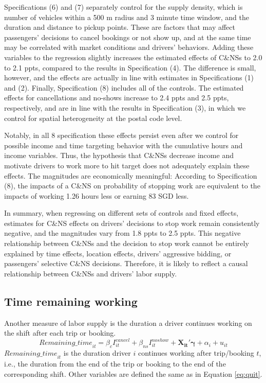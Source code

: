 \documentclass[reviewmode]{AEA}
\begin{document}
Specifications (6) and (7) separately control for the supply density, which is number of vehicles within a 500 m radius and 3 minute time window, and the duration and distance to pickup points. These are factors that may affect passengers' decisions to cancel bookings or not show up, and at the same time may be correlated with market conditions and drivers' behaviors.  Adding these variables to the regression slightly increases the estimated effects of C\&NSs to 2.0 to 2.1 ppts, compared to the results in Specification (4). The difference is small, however, and the effects are actually in line with estimates in Specifications (1) and (2).  Finally, Specification (8) includes all of the controls. The estimated effects for cancellations and no-shows increase to 2.4 ppts and 2.5 ppts, respectively, 
and are in line with the results in Specification (3), in which we control for spatial heterogeneity at the postal code level.

Notably, in all 8 specification these effects persist even after we control for possible income and time targeting behavior with the cumulative hours and income variables. Thus, the hypothesis that C\&NSs decrease income and motivate drivers to work more to hit target does not adequately explain these effects. The magnitudes are economically meaningful: According to Specification (8), the impacts of a C\&NS on probability of stopping work are equivalent to the impacts of working 1.26 hours less or earning 83 SGD less.

In summary, when regressing on different sets of controls and fixed effects, estimates for C\&NS effects on drivers' decisions to stop work remain consistently negative, and the magnitudes vary
from 1.8 ppts to 2.5 ppts. This negative relationship between C\&NSs and the decision to stop work cannot be entirely explained by time effects, location effects, drivers' aggressive bidding, or passengers' selective C\&NS decisions. Therefore, it is likely to reflect a causal relationship between C\&NSs and drivers' labor supply.

\subsection{Time remaining working}
Another measure of labor supply is the duration a driver continues working on the shift after each trip or booking. 
\begin{equation}
\label{eq:rmins}
{Remaining\_time}_{it} = \beta_c I^{cancel}_{it} + \beta_{ns} I^{noshow}_{it}  + \mathbf{X_{it}}'\mathbf{\gamma} + \alpha_i + u_{it}
\end{equation}
${Remaining\_time}_{it}$ is the duration driver $i$ continues working after trip/booking $t$, i.e., the duration from the end of the trip or booking to the end of the corresponding shift. %
Other variables are defined the same as in Equation \eqref{eq:quit}.
\end{document}
